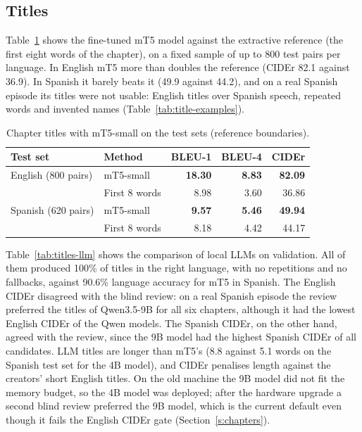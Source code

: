 \subsection*{Titles}
\label{s:res-titles}

Table~\ref{tab:titles-mt5} shows the fine-tuned mT5 model against the extractive reference (the first eight words of the chapter), on a fixed sample of up to 800 test pairs per language. In English mT5 more than doubles the reference (CIDEr 82.1 against 36.9). In Spanish it barely beats it (49.9 against 44.2), and on a real Spanish episode its titles were not usable: English titles over Spanish speech, repeated words and invented names (Table~\ref{tab:title-examples}).

\begin{table}[H]
\centering
\caption{Chapter titles with mT5-small on the test sets (reference boundaries).}
\label{tab:titles-mt5}
\small
\begin{tabular}{@{}llrrr@{}}
\toprule
\textbf{Test set} & \textbf{Method} & \textbf{BLEU-1} & \textbf{BLEU-4} & \textbf{CIDEr} \\
\midrule
English (800 pairs) & mT5-small & \textbf{18.30} & \textbf{8.83} & \textbf{82.09} \\
 & First 8 words & 8.98 & 3.60 & 36.86 \\
Spanish (620 pairs) & mT5-small & \textbf{9.57} & \textbf{5.46} & \textbf{49.94} \\
 & First 8 words & 8.18 & 4.42 & 44.17 \\
\bottomrule
\end{tabular}
\end{table}

Table~\ref{tab:titles-llm} shows the comparison of local LLMs on validation. All of them produced 100\% of titles in the right language, with no repetitions and no fallbacks, against 90.6\% language accuracy for mT5 in Spanish. The English CIDEr disagreed with the blind review: on a real Spanish episode the review preferred the titles of Qwen3.5-9B for all six chapters, although it had the lowest English CIDEr of the Qwen models. The Spanish CIDEr, on the other hand, agreed with the review, since the 9B model had the highest Spanish CIDEr of all candidates. LLM titles are longer than mT5's (8.8 against 5.1 words on the Spanish test set for the 4B model), and CIDEr penalises length against the creators' short English titles. On the old machine the 9B model did not fit the memory budget, so the 4B model was deployed; after the hardware upgrade a second blind review preferred the 9B model, which is the current default even though it fails the English CIDEr gate (Section~\ref{s:chapters}).

